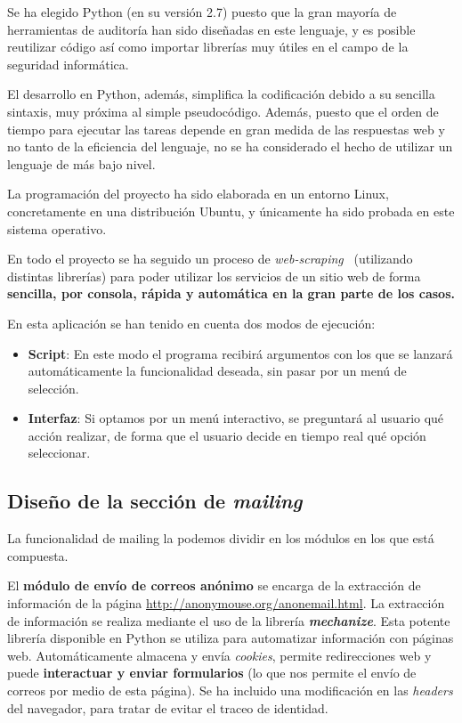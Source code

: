 Se ha elegido Python (en su versión 2.7) puesto que la gran mayoría de herramientas de auditoría han sido diseñadas en este lenguaje, y es posible reutilizar código así como importar librerías muy útiles en el campo de la seguridad informática.

El desarrollo en Python, además, simplifica la codificación debido a su sencilla sintaxis, muy próxima al simple pseudocódigo. Además, puesto que el orden de tiempo para ejecutar las tareas depende en gran medida de las respuestas web y no tanto de la eficiencia del lenguaje, no se ha considerado el hecho de utilizar un lenguaje de más bajo nivel.

La programación del proyecto ha sido elaborada en un entorno Linux, concretamente en una distribución Ubuntu, y únicamente ha sido probada en este sistema operativo.

En todo el proyecto se ha seguido un proceso de \textit{web-scraping}~\cite{article:webscraping} (utilizando distintas librerías) para poder utilizar los servicios de un sitio web de forma \textbf{sencilla, por consola, rápida y automática en la gran parte de los casos.}

En esta aplicación se han tenido en cuenta dos modos de ejecución:

\begin{itemize}
	\item \textbf{Script}: En este modo el programa recibirá argumentos con los que se lanzará automáticamente la funcionalidad deseada, sin pasar por un menú de selección.
	\item \textbf{Interfaz}: Si optamos por un menú interactivo, se preguntará al usuario qué acción realizar, de forma que el usuario decide en tiempo real qué opción seleccionar.
\end{itemize}

\subsection{Diseño de la sección de \textit{mailing}}

La funcionalidad de mailing la podemos dividir en los módulos en los que está compuesta. 

El \textbf{módulo de envío de correos anónimo} se encarga de la extracción de información de la página \url{http://anonymouse.org/anonemail.html}. La extracción de información se realiza mediante el uso de la librería \textbf{\textit{mechanize}}. Esta potente librería disponible en Python se utiliza para automatizar información con páginas web. Automáticamente almacena y envía \textit{cookies}, permite redirecciones web y puede \textbf{interactuar y enviar formularios} (lo que nos permite el envío de correos por medio de esta página).
Se ha incluido una modificación en las \textit{headers} del navegador, para tratar de evitar el traceo de identidad.


